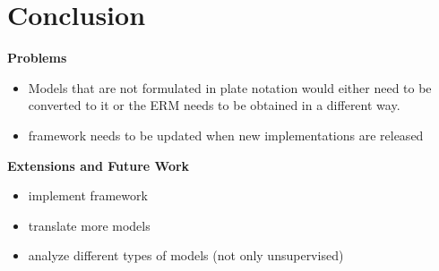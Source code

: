 \section{Conclusion}

\textbf{Problems}
\begin{itemize}
\item Models that are not formulated in plate notation would either need to be converted to it or the ERM needs to be obtained in a different way.
\item framework needs to be updated when new implementations are released
\end{itemize}

\textbf{Extensions and Future Work}
\begin{itemize}
\item implement framework
\item translate more models
\item analyze different types of models (not only unsupervised)
\end{itemize}

